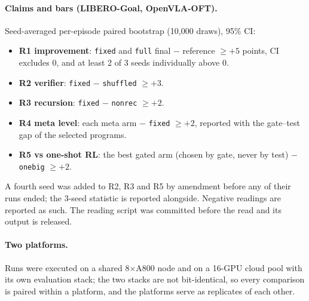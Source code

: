 \paragraph{Claims and bars (LIBERO-Goal, OpenVLA-OFT).} Seed-averaged per-episode paired bootstrap (10{,}000 draws), 95\% CI:
\begin{itemize}[nosep]
  \item \textbf{R1 improvement}: \texttt{fixed} and \texttt{full} final $-$ reference $\geq +5$ points, CI excludes 0, and at least 2 of 3 seeds individually above 0.
  \item \textbf{R2 verifier}: \texttt{fixed} $-$ \texttt{shuffled} $\geq +3$.
  \item \textbf{R3 recursion}: \texttt{fixed} $-$ \texttt{nonrec} $\geq +2$.
  \item \textbf{R4 meta level}: each meta arm $-$ \texttt{fixed} $\geq +2$, reported with the gate--test gap of the selected programs.
  \item \textbf{R5 vs one-shot RL}: the best gated arm (chosen by gate, never by test) $-$ \texttt{onebig} $\geq +2$.
\end{itemize}
A fourth seed was added to R2, R3 and R5 by amendment before any of their runs ended; the 3-seed statistic is reported alongside. Negative readings are reported as such. The reading script was committed before the read and its output is released.

\paragraph{Two platforms.} Runs were executed on a shared 8$\times$A800 node and on a 16-GPU cloud pool with its own evaluation stack; the two stacks are not bit-identical, so every comparison is paired within a platform, and the platforms serve as replicates of each other.
